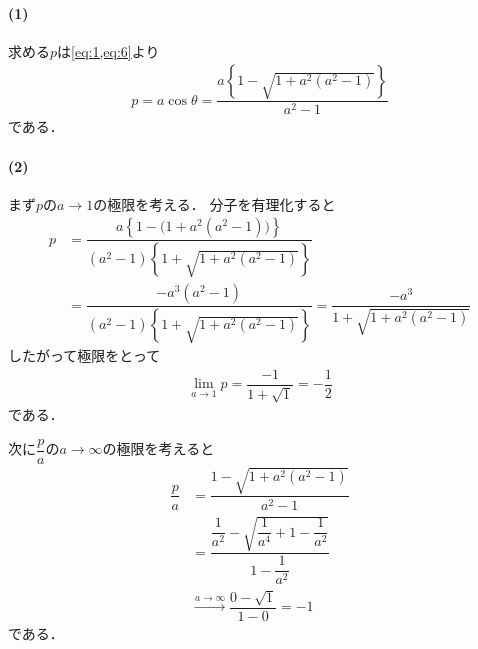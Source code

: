 \documentclass[../../main.tex]{subfiles}
\begin{document}
\paragraph{(1)}

求める$p$は\cref{eq:1,eq:6}より
\begin{align}
  p=a\cos\theta=\dfrac{a\left\{1-\sqrt{1+a^2(a^2-1)}\right\}}{a^2-1}
\end{align}
である．

\paragraph{(2)}

まず$p$の$a\to 1$の極限を考える．
分子を有理化すると
\begin{align}
  p
  &= \dfrac{a\left\{1-\bigl(1+a^2(a^2-1)\bigr)\right\}}{(a^2-1)\left\{1+\sqrt{1+a^2(a^2-1)}\right\}} \\
  &= \dfrac{-a^3(a^2-1)}{(a^2-1)\left\{1+\sqrt{1+a^2(a^2-1)}\right\}}=\dfrac{-a^3}{1+\sqrt{1+a^2(a^2-1)}}
\end{align}
したがって極限をとって
\begin{align}
  \lim_{a\to1}p=\dfrac{-1}{1+\sqrt{1}}=-\dfrac{1}{2}
\end{align}
である．

次に$\dfrac{p}{a}$の$a\to\infty$の極限を考えると
\begin{align}
  \dfrac{p}{a}
  &=\dfrac{1-\sqrt{1+a^2(a^2-1)}}{a^2-1} \\
  &=\dfrac{\dfrac{1}{a^2}-\sqrt{\dfrac{1}{a^4}+1-\dfrac{1}{a^2}}}{1-\dfrac{1}{a^2}} \\
  &\xrightarrow{a\to\infty} \dfrac{0-\sqrt{1}}{1-0}=-1
\end{align}
である．
\end{document}
